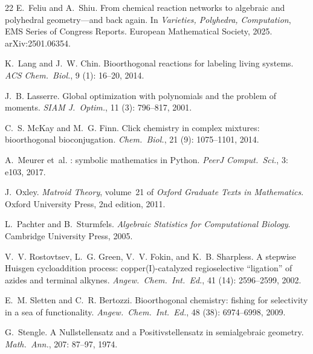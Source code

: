\documentclass[preprint,12pt]{elsarticle}
\theoremstyle{definition}
\theoremstyle{remark}
\begin{document}
\begin{thebibliography}{22}
E.~Feliu and A.~Shiu.
\newblock From chemical reaction networks to algebraic and polyhedral
  geometry---and back again.
\newblock In \emph{Varieties, Polyhedra, Computation}, EMS Series of Congress
  Reports. European Mathematical Society, 2025.
\newblock arXiv:2501.06354.

K.~Lang and J.~W. Chin.
\newblock Bioorthogonal reactions for labeling living systems.
\newblock \emph{ACS Chem.\ Biol.}, 9 (1): 16--20, 2014.

J.~B. Lasserre.
\newblock Global optimization with polynomials and the problem of moments.
\newblock \emph{SIAM J.\ Optim.}, 11 (3): 796--817, 2001.

C.~S. McKay and M.~G. Finn.
\newblock Click chemistry in complex mixtures: bioorthogonal bioconjugation.
\newblock \emph{Chem.\ Biol.}, 21 (9): 1075--1101, 2014.

A.~Meurer et~al.
: symbolic mathematics in {Python}.
\newblock \emph{PeerJ Comput.\ Sci.}, 3: e103, 2017.

J.~Oxley.
\newblock \emph{Matroid Theory}, volume~21 of \emph{Oxford Graduate Texts in
  Mathematics}.
\newblock Oxford University Press, 2nd edition, 2011.

L.~Pachter and B.~Sturmfels.
\newblock \emph{Algebraic Statistics for Computational Biology}.
\newblock Cambridge University Press, 2005.

V.~V. Rostovtsev, L.~G. Green, V.~V. Fokin, and K.~B. Sharpless.
\newblock A stepwise {Huisgen} cycloaddition process: copper({I})-catalyzed
  regioselective ``ligation'' of azides and terminal alkynes.
\newblock \emph{Angew.\ Chem.\ Int.\ Ed.}, 41 (14):
  2596--2599, 2002.

E.~M. Sletten and C.~R. Bertozzi.
\newblock Bioorthogonal chemistry: fishing for selectivity in a sea of
  functionality.
\newblock \emph{Angew.\ Chem.\ Int.\ Ed.}, 48 (38):
  6974--6998, 2009.

G.~Stengle.
\newblock A {Nullstellensatz} and a {Positivstellensatz} in semialgebraic
  geometry.
\newblock \emph{Math.\ Ann.}, 207: 87--97, 1974.


\end{thebibliography}
\end{document}
